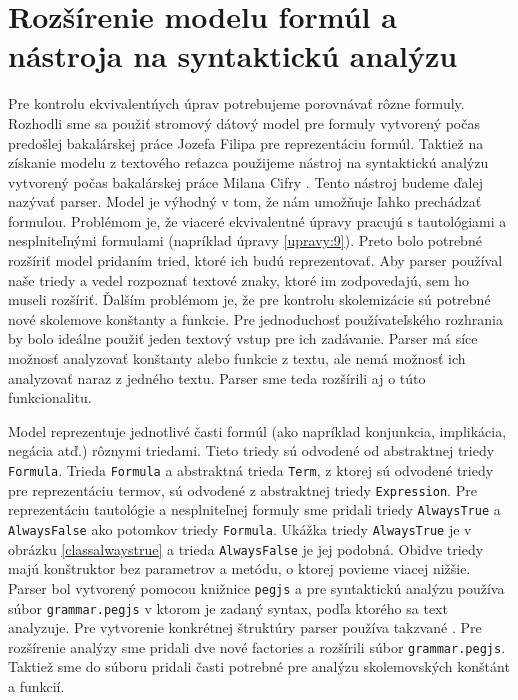 \section{Rozšírenie modelu formúl a nástroja na syntaktickú analýzu}

Pre kontrolu ekvivalentńych úprav potrebujeme porovnávať rôzne formuly. Rozhodli sme sa použiť stromový dátový model pre formuly vytvorený počas predošlej bakalárskej práce Jozefa Filipa \cite{structureexplorer} pre reprezentáciu formúl. Taktiež na získanie modelu z textového reťazca použijeme nástroj na syntaktickú analýzu vytvorený počas bakalárskej práce Milana Cifry \cite{explorercifra}. Tento nástroj budeme ďalej nazývať parser. Model je výhodný v tom, že nám umožňuje ľahko prechádzať formulou. Problémom je, že viaceré ekvivalentné úpravy pracujú s tautológiami a nesplniteľnými formulami (napríklad úpravy \eqref{upravy:9}). Preto bolo potrebné rozšíriť model pridaním tried, ktoré ich budú reprezentovať. Aby parser používal naše triedy a vedel rozpoznať textové znaky, ktoré im zodpovedajú, sem ho museli rozšíriť. Ďalším problémom je, že pre kontrolu skolemizácie sú potrebné nové skolemove konštanty a funkcie. Pre jednoduchosť používateľského rozhrania by bolo ideálne použiť jeden textový vstup pre ich zadávanie. Parser má síce možnosť analyzovať konštanty alebo funkcie z textu, ale nemá možnosť ich analyzovať naraz z jedného textu. Parser sme teda rozšírili aj o túto funkcionalitu.

Model reprezentuje jednotlivé časti formúl (ako napríklad konjunkcia, implikácia, negácia atď.) rôznymi triedami. Tieto triedy sú odvodené od abstraktnej triedy \texttt{Formula}. Trieda \texttt{Formula} a abstraktná trieda \texttt{Term}, z ktorej sú odvodené triedy pre reprezentáciu termov, sú odvodené z abstraktnej triedy \texttt{Expression}. Pre reprezentáciu tautológie a nesplniteľnej formuly sme pridali triedy \texttt{AlwaysTrue} a \texttt{AlwaysFalse} ako potomkov triedy \texttt{Formula}. Ukážka triedy \texttt{AlwaysTrue} je v obrázku \eqref{classalwaystrue} a trieda \texttt{AlwaysFalse} je jej podobná. Obidve triedy majú konštruktor bez parametrov a metódu, o ktorej povieme viacej nižšie. Parser bol vytvorený pomocou knižnice \texttt{pegjs} a pre syntaktickú analýzu používa súbor \texttt{grammar.pegjs} v ktorom je zadaný syntax, podľa ktorého sa text analyzuje. Pre vytvorenie konkrétnej štruktúry parser používa takzvané . Pre rozšírenie analýzy sme pridali dve nové factories a rozšírili súbor \texttt{grammar.pegjs}. Taktiež sme do súboru pridali časti potrebné pre analýzu skolemovských konštánt a funkcií.

